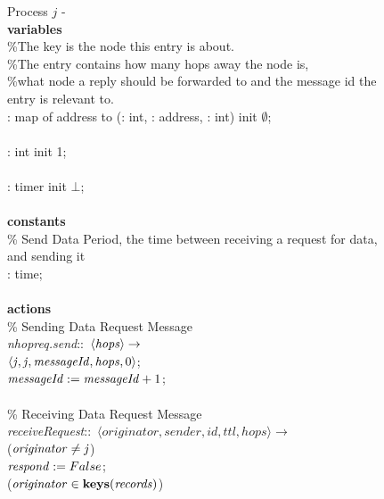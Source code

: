 \begin{figure}[H]
  \centering
  \begin{boxedminipage}{\linewidth}
    \null Process $j$ - \\
    \null \textbf{variables}\\
    \null\qq \%The key is the node this entry is about.\\
    \null\qq \%The entry contains how many hops away the node is,\\
    \null\qq \%what node a reply should be forwarded to and the message id the entry is relevant to.\\
    \null\qq {}: map of address to (: int, : address, : int) init $\emptyset$;\\~\\
    \null\qq {}: int init 1;\\~\\
    \null\qq {}: timer init $\bot$;\\~\\
    \null \textbf{constants}\\
    \null\qq \% Send Data Period, the time between receiving a request for data, and sending it\\
    \null\qq {}: time;\\~\\
    \null \textbf{actions}\\
    \null\qq \% Sending Data Request Message\\
    \null\qq \emph{nhopreq.send}::~$\langle \mbox{\emph{hops}}\rangle\rightarrow$\\
    \null\qq\qq {}$\langle \mbox{\emph{j}}, \mbox{\emph{j}}, \mbox{\emph{messageId}}, \mbox{\emph{hops}}, 0\rangle$;\\
    \null\qq\qq $\mbox{\emph{messageId}} \mathrel{:=} \mbox{\emph{messageId}} + 1$;\\~\\
    \null\qq \% Receiving Data Request Message\\
    \null\qq \emph{receiveRequest}::~$\langle originator, sender, id, ttl, hops\rangle \rightarrow$\\
    \null\qq\qq {} ($\mbox{\emph{originator}} \not= \mbox{\emph{j}}$) \\
    \null\qq\qq\qq $\mbox{\emph{respond}} \mathrel{:=} False$;\\
    \null\qq\qq\qq {} ($\mbox{\emph{originator}} \in \mbox{\textbf{keys}}(\mbox{\emph{records}})$) \\

\end{boxedminipage}
\end{figure}
